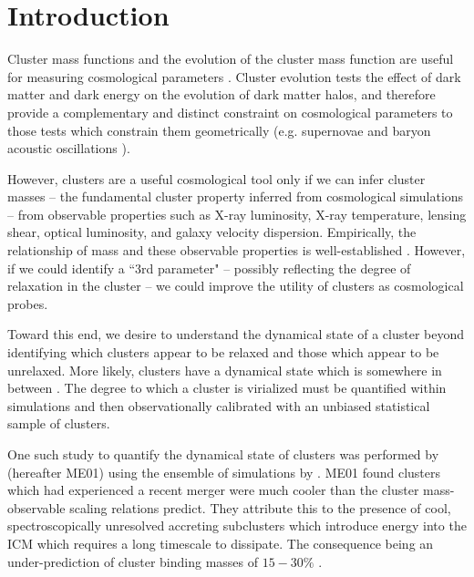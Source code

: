\documentclass{emulateapj}
\begin{document}


\section{Introduction}\label{sec:intro}

Cluster mass functions and the evolution of the cluster mass function
are useful for measuring cosmological parameters
\citep{1989ApJ...341L..71E, 1998ApJ...508..483W, 2001ApJ...553..545H,
2003PhRvD..67h1304H, 2004PhRvD..70l3008W}. Cluster evolution tests the
effect of dark matter and dark energy on the evolution of dark matter
halos, and therefore provide a complementary and distinct constraint
on cosmological parameters to those tests which constrain
them geometrically (e.g. supernovae \citep{1998AJ....116.1009R,
2007ApJ...659...98R} and baryon acoustic oscillations
\citep{2005ApJ...633..560E}).

However, clusters are a useful cosmological tool only if we can infer
cluster masses -- the fundamental cluster property inferred from
cosmological simulations \citep{1990ApJ...363..349E} -- from
observable properties such as X-ray luminosity, X-ray temperature,
lensing shear, optical luminosity, and galaxy velocity
dispersion. Empirically, the relationship of mass and these observable
properties is well-established \citep{2005RvMP...77..207V}. However,
if we could identify a ``3rd parameter" -- possibly reflecting the
degree of relaxation in the cluster -- we could improve the utility of
clusters as cosmological probes.

Toward this end, we desire to understand the dynamical state of a
cluster beyond identifying which clusters appear to be relaxed and
those which appear to be unrelaxed. More likely, clusters have a
dynamical state which is somewhere in between
\citep{2006ApJ...639...64O, 2006ApJ...650..128K}. The degree to which
a cluster is virialized must be quantified within simulations and then
observationally calibrated with an unbiased statistical sample of
clusters.

One such study to quantify the dynamical state of
clusters was performed by \cite{2001ApJ...546..100M} (hereafter ME01)
using the ensemble of simulations by \cite{1997ApJ...491...38M}. ME01
found clusters which had experienced a recent merger were much cooler
than the cluster mass-observable scaling relations predict. They
attribute this to the presence of cool, spectroscopically unresolved
accreting subclusters which introduce energy into the ICM which
requires a long timescale to dissipate. The consequence being an
under-prediction of cluster binding masses of $15-30\%$
\citep{2001ApJ...546..100M}.
\end{document}
